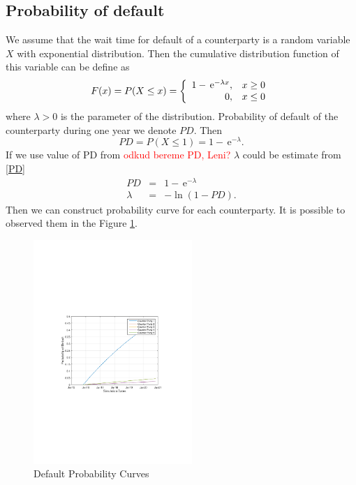 \documentclass{amsart}
\theoremstyle{definition}\newtheorem{definition}[theorem]{Definition}
\theoremstyle{remark}\newtheorem{remark}[theorem]{Remark}
\newcommand{\e}{\,\mathrm{e}}
\begin{document}
\subsection{Probability of default}
We assume that the wait time for default of a counterparty is a random variable $X$ with exponential distribution. Then the cumulative distribution function of this variable can be define as
\begin{equation}
F(x)= P(X\leq x)= \left\{ \begin{array}{r@{\quad}c}
    1-\e^{-\lambda x}, & x \geq 0 \\
    0, & x \leq 0 \\ \end{array} \right.
    \label{exponentialdistr}
\end{equation}
where $\lambda>0$ is the parameter of the distribution. Probability of default of the counterparty during one year we denote $PD$. Then 
\begin{equation}
PD=P(X\leq 1)=1-\e^{-\lambda}.
\label{PD}
\end{equation}
If we use value of PD from \textcolor{red}{odkud bereme PD, Leni?}  $\lambda$ could be estimate from \eqref{PD} 
\begin{eqnarray}
PD&=&1-\e^{-\lambda} \nonumber \\
\lambda&=&-\ln(1-PD).
\end{eqnarray}
Then we can construct probability curve for each counterparty. It is possible to observed them in the Figure \ref{DefaultProbability}.

\begin{figure}[!htbp]
  \centering 
	\includegraphics[width=6cm, clip, trim= 110 270 110 270]{IMG/DefaultProbability.pdf}
  \caption{Default Probability Curves}  \label{DefaultProbability}
\end{figure}
\end{document}
